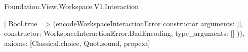 \begin{lexlean}{Foundation.View.Workspace.V1.Interaction}
\begin{semanticmodule}
{    | Bool.true => (encodeWorkspaceInteractionError constructor{
      arguments: [],
      constructor: WorkspaceInteractionError.BadEncoding,
      type_arguments: []
    })),
  axioms: [Classical.choice, Quot.sound, propext]
}
\end{semanticmodule}
\end{lexlean}

